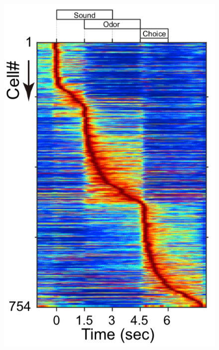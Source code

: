 \documentclass{apa}
\begin{document}
\begin{figure}
\begin{minipage}{\linewidth}
\begin{minipage}{.28\linewidth}
\begin{center}
				\includegraphics[width =\linewidth]{figs/TeraEtal17.png}
		\end{center}
	\end{minipage}
	\begin{minipage}{.51\linewidth}
		\begin{minipage}{.49\linewidth}
			\begin{center}

\end{center}
\end{minipage}
\end{minipage}
\end{minipage}
\end{figure}
\end{document}
